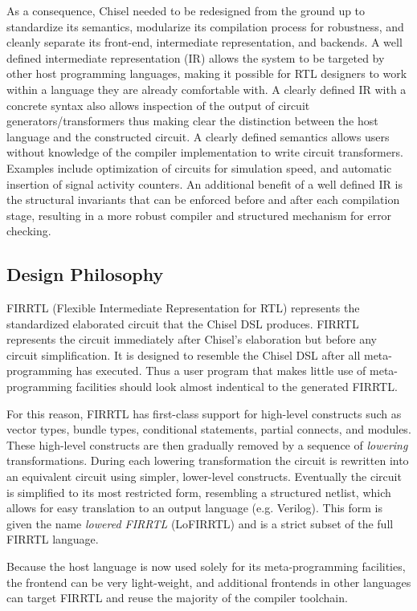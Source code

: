 \documentclass[12pt]{article}
\begin{document}
As a consequence, Chisel needed to be redesigned from the ground up to standardize its semantics, modularize its compilation process for robustness, and cleanly separate its front-end, intermediate representation, and backends. A well defined intermediate representation (IR) allows the system to be targeted by other host programming languages, making it possible for RTL designers to work within a language they are already comfortable with. A clearly defined IR with a concrete syntax also allows inspection of the output of circuit generators/transformers thus making clear the distinction between the host language and the constructed circuit. A clearly defined semantics allows users without knowledge of the compiler implementation to write circuit transformers. Examples include optimization of circuits for simulation speed, and automatic insertion of signal activity counters. An additional benefit of a well defined IR is the structural invariants that can be enforced before and after each compilation stage, resulting in a more robust compiler and structured mechanism for error checking. 

\subsection{Design Philosophy}
FIRRTL (Flexible Intermediate Representation for RTL) represents the standardized elaborated circuit that the Chisel DSL produces. FIRRTL represents the circuit immediately after Chisel's elaboration but before any circuit simplification. It is designed to resemble the Chisel DSL after all meta-programming has executed. Thus a user program that makes little use of meta-programming facilities should look almost indentical to the generated FIRRTL.

For this reason, FIRRTL has first-class support for high-level constructs such as vector types, bundle types, conditional statements, partial connects, and modules. These high-level constructs are then gradually removed by a sequence of {\em lowering} transformations. During each lowering transformation the circuit is rewritten into an equivalent circuit using simpler, lower-level constructs. Eventually the circuit is simplified to its most restricted form, resembling a structured netlist, which allows for easy translation to an output language (e.g. Verilog). This form is given the name {\em lowered FIRRTL} (LoFIRRTL) and is a strict subset of the full FIRRTL language.

Because the host language is now used solely for its meta-programming facilities, the frontend can be very light-weight, and additional frontends in other languages can target FIRRTL and reuse the majority of the compiler toolchain.
\end{document}
